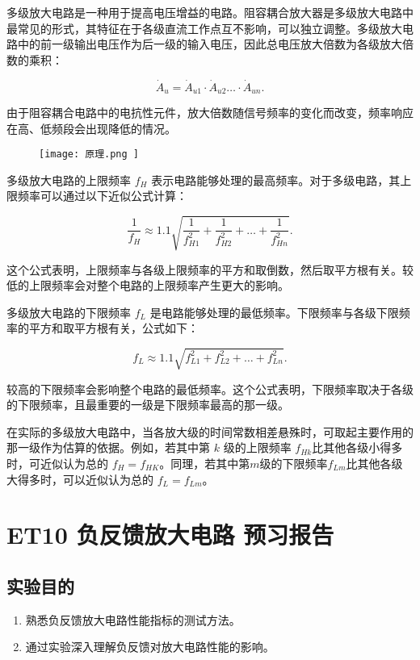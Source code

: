 \documentclass[dvipsnames, svgnames,a4paper,11pt]{article}
\begin{document}
多级放大电路是一种用于提高电压增益的电路。阻容耦合放大器是多级放大电路中最常见的形式，其特征在于各级直流工作点互不影响，可以独立调整。多级放大电路中的前一级输出电压作为后一级的输入电压，因此总电压放大倍数为各级放大倍数的乘积：

\[
\dot{A}_u = \dot{A}_{u1} \cdot \dot{A}_{u2} \ldots \cdot \dot{A}_{un}.
\]

由于阻容耦合电路中的电抗性元件，放大倍数随信号频率的变化而改变，频率响应在高、低频段会出现降低的情况。
\begin{figure}[{H}]
	\centering
	\texttt{[image: 原理.png
	]}
	
	\label{}
\end{figure}

多级放大电路的上限频率 \(f_H\) 表示电路能够处理的最高频率。对于多级电路，其上限频率可以通过以下近似公式计算：

\[
\frac{1}{f_H} \approx 1.1 \sqrt{\frac{1}{f_{H1}^2} + \frac{1}{f_{H2}^2} + \ldots + \frac{1}{f_{Hn}^2}}.
\]

这个公式表明，上限频率与各级上限频率的平方和取倒数，然后取平方根有关。较低的上限频率会对整个电路的上限频率产生更大的影响。

多级放大电路的下限频率 \(f_L\) 是电路能够处理的最低频率。下限频率与各级下限频率的平方和取平方根有关，公式如下：

\[
f_L \approx 1.1 \sqrt{f_{L1}^2 + f_{L2}^2 + \ldots + f_{Ln}^2}.
\]

较高的下限频率会影响整个电路的最低频率。这个公式表明，下限频率取决于各级的下限频率，且最重要的一级是下限频率最高的那一级。

在实际的多级放大电路中，当各放大级的时间常数相差悬殊时，可取起主要作用的那一级作为估算的依据。例如，若其中第 $k$ 级的上限频率 $f_{Hk}$比其他各级小得多时，可近似认为总的 $f_H=f_{HK}$。同理，若其中第$m$级的下限频率${f}_{Lm}$比其他各级大得多时，可以近似认为总的 $f_{L}={f}_{Lm}$。

	\clearpage
	\section{ET10 负反馈放大电路  \quad\heiti 预习报告}
	
	\subsection{实验目的}
	\begin{enumerate}
		\item 熟悉负反馈放大电路性能指标的测试方法。
		\item 通过实验深入理解负反馈对放大电路性能的影响。
		
		
	\end{enumerate}
	
\end{document}
